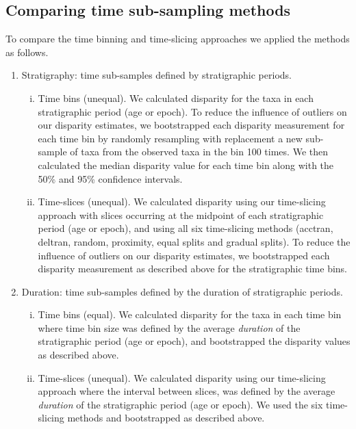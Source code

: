 \documentclass[12pt,a4paper]{article}
\begin{document}
\subsection{Comparing time sub-sampling methods}

To compare the time binning and time-slicing approaches we applied the methods as follows. 

\begin{enumerate}
  \item Stratigraphy: time sub-samples defined by stratigraphic periods. 
  \begin{enumerate}[(i)]
    \item Time bins (unequal). 
    We calculated disparity for the taxa in each stratigraphic period (age or epoch). 
    To reduce the influence of outliers on our disparity estimates, we bootstrapped each disparity measurement for each time bin by randomly resampling with replacement a new sub-sample of taxa from the observed taxa in the bin 100 times.
    We then calculated the median disparity value for each time bin along with the 50\% and 95\% confidence intervals.
    \item Time-slices (unequal).
    We calculated disparity using our time-slicing approach with slices occurring at the midpoint of each stratigraphic period (age or epoch), and using all six time-slicing methods (acctran, deltran, random, proximity, equal splits and gradual splits).
    To reduce the influence of outliers on our disparity estimates, we bootstrapped each disparity measurement as described above for the stratigraphic time bins.
    \end{enumerate}

  \item Duration: time sub-samples defined by the duration of stratigraphic periods. 
  \begin{enumerate}[(i)]
    \item Time bins (equal). 
    We calculated disparity for the taxa in each time bin where time bin size was defined by the average \textit{duration} of the stratigraphic period (age or epoch), and bootstrapped the disparity values as described above.
    \item Time-slices (unequal).
    We calculated disparity using our time-slicing approach where the interval between slices, was defined by the average \textit{duration} of the stratigraphic period (age or epoch).
    We used the six time-slicing methods and bootstrapped as described above.
  \end{enumerate}


\end{enumerate}
\end{document}
